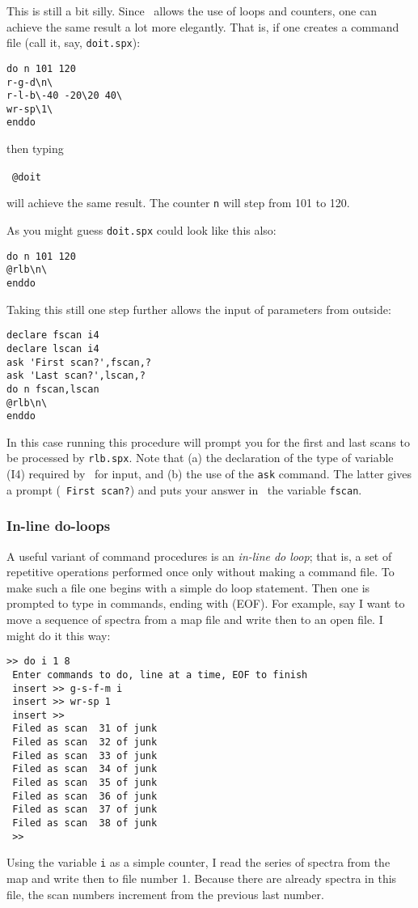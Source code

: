 This is still a bit silly. Since \SPECX\ allows the use of loops and
counters, one can achieve the same result a lot more elegantly. That
is, if one creates a command file (call it, say, {\tt doit.spx}):

\begin{verbatim}
do n 101 120
r-g-d\n\ 
r-l-b\-40 -20\20 40\ 
wr-sp\1\ 
enddo
\end{verbatim}

then typing

\SP\ \verb|@doit|

will achieve the same result. The counter {\tt n} will step from 101
to 120.

As you might guess {\tt doit.spx} could look like this also:

\begin{verbatim}
do n 101 120
@rlb\n\
enddo
\end{verbatim}

Taking this still one step further allows the input of parameters from
outside:

\begin{verbatim}
declare fscan i4
declare lscan i4
ask 'First scan?',fscan,?
ask 'Last scan?',lscan,?
do n fscan,lscan
@rlb\n\
enddo
\end{verbatim}

In this case running this procedure will prompt you for the first and
last scans to be processed by {\tt rlb.spx}. Note that (a) the
declaration of the type of variable (I4) required by \SPECX\ for
input, and (b) the use of the {\tt ask} command. The latter gives a
prompt (\eg\ {\tt First scan?}) and puts your answer in \eg\ the
variable {\tt fscan}.

\subsubsection{In-line do-loops}
\label{sec:do-loops}
A useful variant of command procedures is an {\it in-line do loop};
that is, a set of repetitive operations performed once only without
making a command file. To make such a file one begins with a simple do
loop statement. Then one is prompted to type in commands, ending with
\ctrld (EOF). For example, say I want to move a sequence of spectra
from a map file and write then to an open file. I might do it this
way:
\begin{verbatim}
>> do i 1 8
 Enter commands to do, line at a time, EOF to finish
 insert >> g-s-f-m i
 insert >> wr-sp 1
 insert >>  
 Filed as scan  31 of junk                    
 Filed as scan  32 of junk                       
 Filed as scan  33 of junk                       
 Filed as scan  34 of junk                       
 Filed as scan  35 of junk                       
 Filed as scan  36 of junk                       
 Filed as scan  37 of junk                       
 Filed as scan  38 of junk                       
 >>
\end{verbatim}
Using the variable {\tt i} as a simple counter, I read the series of
spectra from the map and write then to file number 1. Because there
are already spectra in this file, the scan numbers increment from the
previous last number.

